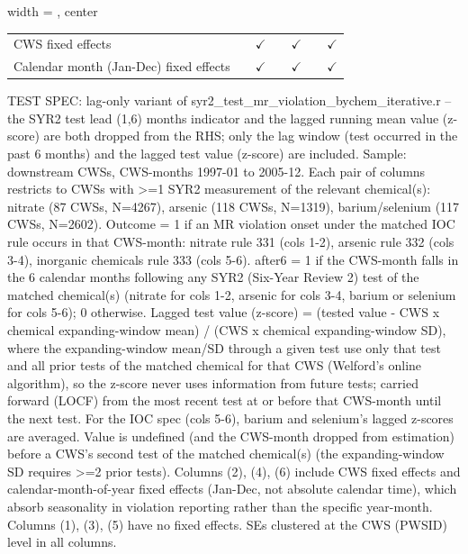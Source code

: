 \begin{table}[htbp]
\begin{adjustbox}{width = \textwidth, center}
\begin{tabular}{lcccccc}
          \\
         
         CWS fixed effects                      &              & $\checkmark$  &          & $\checkmark$  &          & $\checkmark$\\   
         Calendar month (Jan-Dec) fixed effects &              & $\checkmark$  &          & $\checkmark$  &          & $\checkmark$\\   
         
         \bottomrule
         
      \end{tabular}
      
      
      
   \end{adjustbox}
      {\tiny\linespread{1}\selectfont \par \raggedright 
   TEST SPEC: lag-only variant of syr2\_test\_mr\_violation\_bychem\_iterative.r -- the SYR2 test lead (1,6) months indicator and the lagged running mean value (z-score) are both dropped from the RHS; only the lag window (test occurred in the past 6 months) and the lagged test value (z-score) are included. Sample: downstream CWSs, CWS-months 1997-01 to 2005-12. Each pair of columns restricts to CWSs with >=1 SYR2 measurement of the relevant chemical(s): nitrate (87 CWSs, N=4267), arsenic (118 CWSs, N=1319), barium/selenium (117 CWSs, N=2602). Outcome = 1 if an MR violation onset under the matched IOC rule occurs in that CWS-month: nitrate rule 331 (cols 1-2), arsenic rule 332 (cols 3-4), inorganic chemicals rule 333 (cols 5-6). after6 = 1 if the CWS-month falls in the 6 calendar months following any SYR2 (Six-Year Review 2) test of the matched chemical(s) (nitrate for cols 1-2, arsenic for cols 3-4, barium or selenium for cols 5-6); 0 otherwise. Lagged test value (z-score) = (tested value - CWS x chemical expanding-window mean) / (CWS x chemical expanding-window SD), where the expanding-window mean/SD through a given test use only that test and all prior tests of the matched chemical for that CWS (Welford's online algorithm), so the z-score never uses information from future tests; carried forward (LOCF) from the most recent test at or before that CWS-month until the next test. For the IOC spec (cols 5-6), barium and selenium's lagged z-scores are averaged. Value is undefined (and the CWS-month dropped from estimation) before a CWS's second test of the matched chemical(s) (the expanding-window SD requires >=2 prior tests). Columns (2), (4), (6) include CWS fixed effects and calendar-month-of-year fixed effects (Jan-Dec, not absolute calendar time), which absorb seasonality in violation reporting rather than the specific year-month. Columns (1), (3), (5) have no fixed effects. SEs clustered at the CWS (PWSID) level in all columns.}
   
\end{table}


